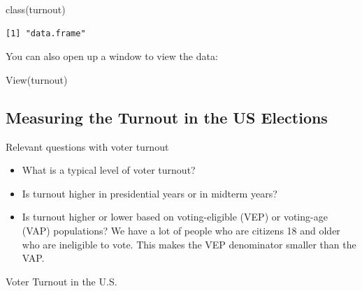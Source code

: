 \documentclass[
  letterpaper,
  DIV=11,
  numbers=noendperiod]{scrreprt}
\newenvironment{Shaded}{\begin{snugshade}}{\end{snugshade}}
\newcommand{\FunctionTok}[1]{\textcolor[rgb]{0.28,0.35,0.67}{#1}}
\newcommand{\NormalTok}[1]{\textcolor[rgb]{0.00,0.23,0.31}{#1}}
\providecommand{\tightlist}{%
  \setlength{\itemsep}{0pt}\setlength{\parskip}{0pt}}\usepackage{longtable,booktabs,array}
\begin{document}
\begin{Shaded}
\begin{Highlighting}[]
\FunctionTok{class}\NormalTok{(turnout)}
\end{Highlighting}
\end{Shaded}

\begin{verbatim}
[1] "data.frame"
\end{verbatim}

You can also open up a window to view the data:

\begin{Shaded}
\begin{Highlighting}[]
\FunctionTok{View}\NormalTok{(turnout)}
\end{Highlighting}
\end{Shaded}

\hypertarget{measuring-the-turnout-in-the-us-elections}{%
\subsection{Measuring the Turnout in the US
Elections}\label{measuring-the-turnout-in-the-us-elections}}

Relevant questions with voter turnout

\begin{itemize}
\tightlist
\item
  What is a typical level of voter turnout?
\item
  Is turnout higher in presidential years or in midterm years?
\item
  Is turnout higher or lower based on voting-eligible (VEP) or
  voting-age (VAP) populations? We have a lot of people who are citizens
  18 and older who are ineligible to vote. This makes the VEP
  denominator smaller than the VAP.
\end{itemize}

Voter Turnout in the U.S.
\end{document}
